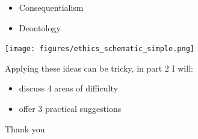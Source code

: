 \documentclass{beamer}
\begin{document}
\begin{frame}

\begin{itemize}
\item Consequentialism
\item Deontology
\end{itemize}

\end{frame}
%
%
\begin{frame}

\begin{center}
\texttt{[image: figures/ethics\_schematic\_simple.png]}
\end{center}

\end{frame}
\begin{frame}

Applying these ideas can be tricky, in part 2 I will:
\begin{itemize}
\item discuss 4 areas of difficulty
\item offer 3 practical suggestions
\end{itemize}

\end{frame}
\begin{frame}

\begin{center}
\LARGE
Thank you
\end{center}

\end{frame}
\end{document}
